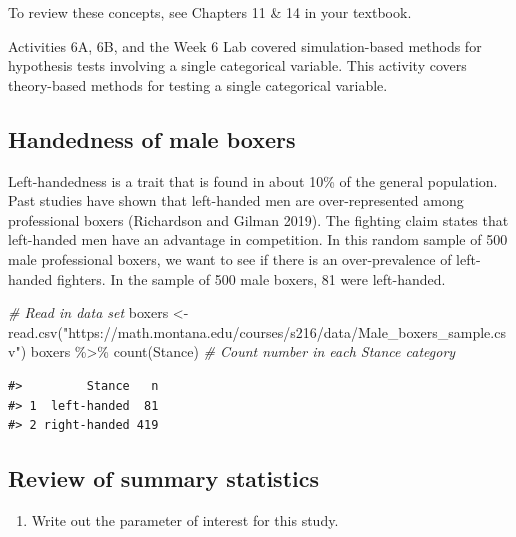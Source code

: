 \documentclass[
]{report}
\newenvironment{Shaded}{\begin{snugshade}}{\end{snugshade}}
\newcommand{\CommentTok}[1]{\textcolor[rgb]{0.56,0.35,0.01}{\textit{#1}}}
\newcommand{\FunctionTok}[1]{\textcolor[rgb]{0.00,0.00,0.00}{#1}}
\newcommand{\NormalTok}[1]{#1}
\newcommand{\OtherTok}[1]{\textcolor[rgb]{0.56,0.35,0.01}{#1}}
\newcommand{\SpecialCharTok}[1]{\textcolor[rgb]{0.00,0.00,0.00}{#1}}
\newcommand{\StringTok}[1]{\textcolor[rgb]{0.31,0.60,0.02}{#1}}
\providecommand{\tightlist}{%
  \setlength{\itemsep}{0pt}\setlength{\parskip}{0pt}}
\begin{document}
To review these concepts, see Chapters 11 \& 14 in your textbook.

Activities 6A, 6B, and the Week 6 Lab covered simulation-based methods for hypothesis tests involving a single categorical variable. This activity covers theory-based methods for testing a single categorical variable.

\hypertarget{handedness-of-male-boxers}{%
\subsection{Handedness of male boxers}\label{handedness-of-male-boxers}}

Left-handedness is a trait that is found in about 10\% of the general population. Past studies have shown that left-handed men are over-represented among professional boxers (Richardson and Gilman 2019). The fighting claim states that left-handed men have an advantage in competition. In this random sample of 500 male professional boxers, we want to see if there is an over-prevalence of left-handed fighters. In the sample of 500 male boxers, 81 were left-handed.

\begin{Shaded}
\begin{Highlighting}[]
 \CommentTok{\# Read in data set}
\NormalTok{boxers }\OtherTok{\textless{}{-}} \FunctionTok{read.csv}\NormalTok{(}\StringTok{"https://math.montana.edu/courses/s216/data/Male\_boxers\_sample.csv"}\NormalTok{)}
\NormalTok{boxers }\SpecialCharTok{\%\textgreater{}\%} \FunctionTok{count}\NormalTok{(Stance)  }\CommentTok{\# Count number in each Stance category}
\end{Highlighting}
\end{Shaded}

\begin{verbatim}
#>         Stance   n
#> 1  left-handed  81
#> 2 right-handed 419
\end{verbatim}

\hypertarget{review-of-summary-statistics}{%
\subsection*{Review of summary statistics}\label{review-of-summary-statistics}}

\begin{enumerate}
\def\labelenumi{\arabic{enumi}.}
\tightlist
\item
  Write out the parameter of interest for this study.
\end{enumerate}
\end{document}
